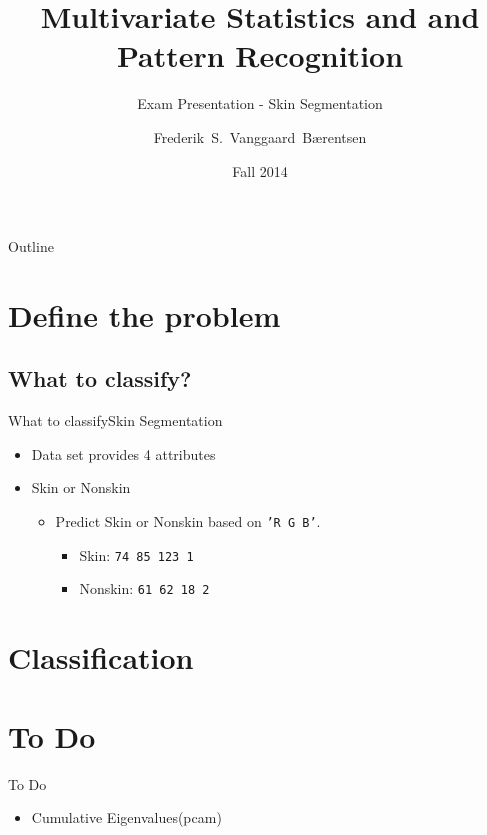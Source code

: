 \documentclass{beamer}
\title{Multivariate Statistics and and Pattern Recognition}
\subtitle{Exam Presentation - Skin Segmentation}
\author{Frederik~S.~Vanggaard~B\ae rentsen}
\institute[Aalborg University - Copenhagen] %
{
  School of Information, Communication and Technology\\
  Aalborg University - Copenhagen}
\date{Fall 2014}
\begin{document}
\begin{frame}
  \titlepage
\end{frame}

\begin{frame}{Outline}
  \tableofcontents
\end{frame}




\section{Define the problem}

\subsection{What to classify?}

\begin{frame}{What to classify}{Skin Segmentation}
  \begin{itemize}
  \item {
    Data set provides 4 attributes
  }
  \item {
    Skin or Nonskin
    \pause
    \begin{itemize}
        \item Predict Skin or Nonskin based on \texttt{'R G B'}. 
        \pause
        \begin{itemize}
            \item Skin: \texttt{74 85 123 1}
            \item Nonskin: \texttt{61 62 18 2}
        \end{itemize}
    \end{itemize}
  }
  \end{itemize}
\end{frame}

\section{Classification}

\section{To Do}
\begin{frame}{To Do}
    \begin{itemize}
        \item Cumulative Eigenvalues(pcam)
    \end{itemize}
\end{frame}
\end{document}
